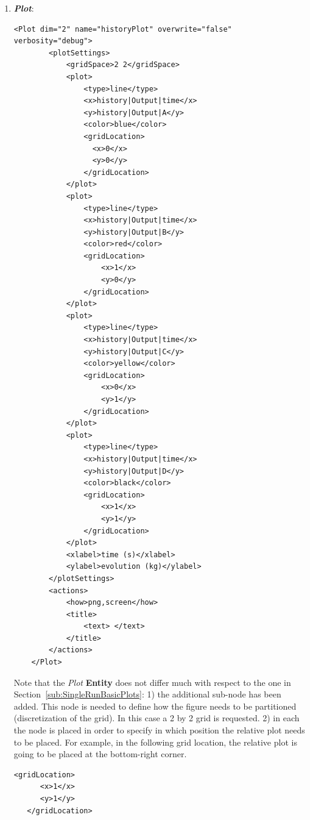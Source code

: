 \begin{enumerate}
   \item \textbf{\textit{Plot}}:
   \begin{lstlisting}[style=XML,morekeywords={arg,extension,pauseAtEnd,overwrite}]
    <Plot dim="2" name="historyPlot" overwrite="false" verbosity="debug">
        <plotSettings>
            <gridSpace>2 2</gridSpace>
            <plot>
                <type>line</type>
                <x>history|Output|time</x>
                <y>history|Output|A</y>
                <color>blue</color>
                <gridLocation>
                  <x>0</x>
                  <y>0</y>
                </gridLocation>
            </plot>
            <plot>
                <type>line</type>
                <x>history|Output|time</x>
                <y>history|Output|B</y>
                <color>red</color>
                <gridLocation>
                    <x>1</x>
                    <y>0</y>
                </gridLocation>
            </plot>
            <plot>
                <type>line</type>
                <x>history|Output|time</x>
                <y>history|Output|C</y>
                <color>yellow</color>
                <gridLocation>
                    <x>0</x>
                    <y>1</y>
                </gridLocation>
            </plot>
            <plot>
                <type>line</type>
                <x>history|Output|time</x>
                <y>history|Output|D</y>
                <color>black</color>
                <gridLocation>
                    <x>1</x>
                    <y>1</y>
                </gridLocation>
            </plot>
            <xlabel>time (s)</xlabel>
            <ylabel>evolution (kg)</ylabel>
        </plotSettings>
        <actions>
            <how>png,screen</how>
            <title>
                <text> </text>
            </title>
        </actions>
    </Plot>
\end{lstlisting}   
 Note that the  \textit{Plot} \textbf{Entity} does not differ much with respect to the one in 
 Section~\ref{sub:SingleRunBasicPlots}: 1) the additional sub-node   has been added. 
 This node is needed to define how the figure needs to be partitioned (discretization of the grid). In this case
 a 2 by 2 grid is requested. 2) in each  the node  is placed in 
 order to specify in which position the relative plot needs to be placed. For example, in the following grid 
 location, the relative plot is going to be placed at the bottom-right corner.
  \begin{lstlisting}[style=XML,morekeywords={arg,extension,pauseAtEnd,overwrite}]
   <gridLocation>
      <x>1</x>
      <y>1</y>
   </gridLocation>
   \end{lstlisting}   
 \end{enumerate}
